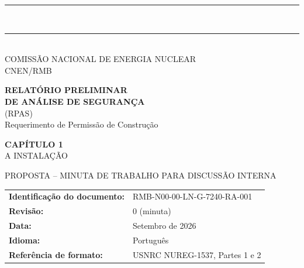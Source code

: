 \clearpage
{}
\thispagestyle{empty}
\singlespacing
\begin{center}

\rule{\textwidth}{1.6pt}\\[2pt]
\rule{\textwidth}{0.6pt}\\[14pt]

{\sffamily\large COMISSÃO NACIONAL DE ENERGIA NUCLEAR}\\[2pt]
{\sffamily\small CNEN/RMB}

\vspace{0.8cm}

{\sffamily\bfseries\LARGE RELAT\'ORIO PRELIMINAR\\[3pt] DE AN\'ALISE DE SEGURAN\c{C}A}\\[8pt]
{\sffamily\normalsize (RPAS)}\\[3pt]
{\sffamily\normalsize Requerimento de Permiss\~ao de Constru\c{c}\~ao}

\vspace{0.6cm}

{\sffamily\bfseries\Large CAP\'ITULO 1}\\[4pt]
{\sffamily\large A INSTALA\c{C}\~AO}

\vspace{0.35cm}
{\sffamily\small PROPOSTA -- MINUTA DE TRABALHO PARA DISCUSS\~AO INTERNA}

\vspace{0.5cm}

\begin{tabular}{@{}>{\raggedright}p{}p{}@{}}
\textbf{Identifica\c{c}\~ao do documento:} & RMB-N00-00-LN-G-7240-RA-001 \\
\textbf{Revis\~ao:} & 0 (minuta) \\
\textbf{Data:} & Setembro de 2026 \\
\textbf{Idioma:} & Portugu\^es \\
\textbf{Refer\^encia de formato:} & USNRC NUREG-1537, Partes 1 e 2 \citep{nureg1537p1,nureg1537p2}\\
\end{tabular}

\vfill


\end{center}
